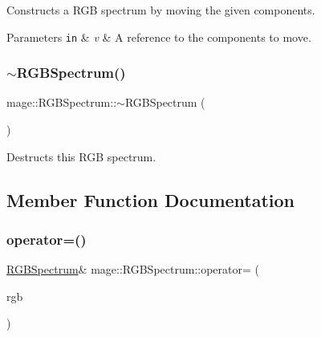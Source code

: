 Constructs a R\+GB spectrum by moving the given components.


\begin{DoxyParams}[1]{Parameters}
\mbox{\tt in}  & {\em v} & A reference to the components to move. \\
\hline
\end{DoxyParams}
\hypertarget{structmage_1_1_r_g_b_spectrum_a7c18a007349953b1e4711a4856680b02}{}\label{structmage_1_1_r_g_b_spectrum_a7c18a007349953b1e4711a4856680b02} 
\subsubsection{\texorpdfstring{$\sim$\+R\+G\+B\+Spectrum()}{~RGBSpectrum()}}
{\footnotesize\ttfamily mage\+::\+R\+G\+B\+Spectrum\+::$\sim$\+R\+G\+B\+Spectrum (\begin{DoxyParamCaption}{ }\end{DoxyParamCaption})\hspace{0.3cm}{\ttfamily [default]}}

Destructs this R\+GB spectrum. 

\subsection{Member Function Documentation}
\hypertarget{structmage_1_1_r_g_b_spectrum_ac4701cc62489d27130853c3ba667a767}{}\label{structmage_1_1_r_g_b_spectrum_ac4701cc62489d27130853c3ba667a767} 
\subsubsection{\texorpdfstring{operator=()}{operator=()}\hspace{0.1cm}{\footnotesize\ttfamily [1/2]}}
{\footnotesize\ttfamily \hyperlink{structmage_1_1_r_g_b_spectrum}{R\+G\+B\+Spectrum}\& mage\+::\+R\+G\+B\+Spectrum\+::operator= (\begin{DoxyParamCaption}\item[{const \hyperlink{structmage_1_1_r_g_b_spectrum}{R\+G\+B\+Spectrum} \&}]{rgb }\end{DoxyParamCaption})\hspace{0.3cm}{\ttfamily [default]}}

